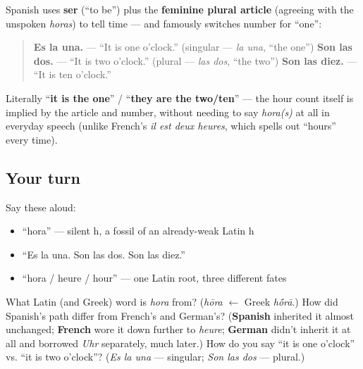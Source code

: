 \begin{grammarlens}[title={Grammar Lens: Son las and telling time}]
Spanish uses \textbf{ser} (\textquotedblleft{}to be\textquotedblright{}) plus the \textbf{feminine plural article} (agreeing with the unspoken \emph{horas}) to tell time — and famously switches number for \textquotedblleft{}one\textquotedblright{}:

\begin{quote}
\textbf{Es la una.} — \textquotedblleft{}It is one o'clock.\textquotedblright{} (singular — \emph{la una}, \textquotedblleft{}the one\textquotedblright{}) \textbf{Son las dos.} — \textquotedblleft{}It is two o'clock.\textquotedblright{} (plural — \emph{las dos}, \textquotedblleft{}the two\textquotedblright{}) \textbf{Son las diez.} — \textquotedblleft{}It is ten o'clock.\textquotedblright{}
\end{quote}

Literally \textquotedblleft{}\textbf{it is the one}\textquotedblright{} / \textquotedblleft{}\textbf{they are the two/ten}\textquotedblright{} — the hour count itself is implied by the article and number, without needing to say \emph{hora(s)} at all in everyday speech (unlike French's \emph{il est deux heures}, which spells out \textquotedblleft{}hours\textquotedblright{} every time).
\end{grammarlens}

\subsection*{Your turn}
Say these aloud:

\begin{itemize}
\raggedright
  \item \textquotedblleft{}hora\textquotedblright{} — silent h, a fossil of an already-weak Latin h
  \item \textquotedblleft{}Es la una. Son las dos. Son las diez.\textquotedblright{}
  \item \textquotedblleft{}hora / heure / hour\textquotedblright{} — one Latin root, three different fates
\end{itemize}

\begin{tcolorbox}[breakable,colback=teal!4,colframe=teal!35!black,title={Before you move on}]
What Latin (and Greek) word is \emph{hora} from? (\emph{hōra} $\leftarrow$ Greek \emph{h\'{\={o}}rā}.) How did Spanish's path differ from French's and German's? (\textbf{Spanish} inherited it almost unchanged; \textbf{French} wore it down further to \emph{heure}; \textbf{German} didn't inherit it at all and borrowed \emph{Uhr} separately, much later.) How do you say \textquotedblleft{}it is one o'clock\textquotedblright{} vs. \textquotedblleft{}it is two o'clock\textquotedblright{}? (\emph{Es la una} — singular; \emph{Son las dos} — plural.)
\end{tcolorbox}
